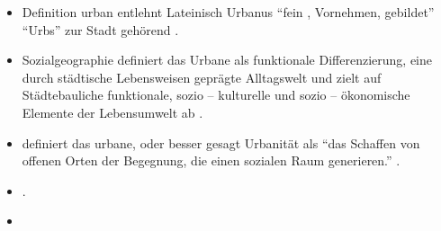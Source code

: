 \begin{itemize}
\item Definition urban entlehnt Lateinisch Urbanus \enquote{fein , Vornehmen, gebildet}
\enquote{Urbs} zur Stadt gehörend \autocite[136]{Holub18}.  
\item Sozialgeographie definiert das Urbane als funktionale Differenzierung, eine durch städtische Lebensweisen geprägte Alltagswelt und zielt auf Städtebauliche funktionale, sozio -- kulturelle und sozio -- ökonomische Elemente der Lebensumwelt ab
\autocite[136]{Holub18}.  
\item \textcite[136]{Holub18} definiert das urbane, oder besser gesagt Urbanität als \enquote{das Schaffen von offenen Orten der Begegnung, die einen sozialen Raum generieren.}
 \autocite[136]{Holub18}. 
\item 
\autocite[14]{Holub18}. 
 \item 
\end{itemize}
